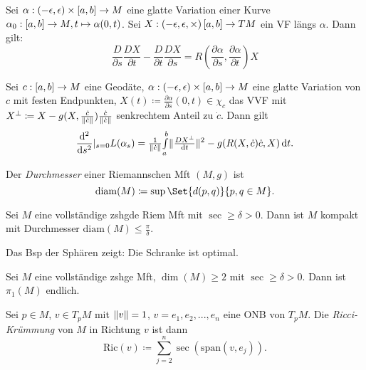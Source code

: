 \documentclass{cheat-sheet}
\newcommand{\vinterval}{\ointerval{-\epsilon}{\epsilon}} %
\newcommand{\Span}{\mathrm{span}} %
\newcommand{\diam}{\mathrm{diam}} %
\newcommand{\Ric}{\mathrm{Ric}} %
\newcommand{\abinterval}{\cinterval{a}{b}} %
\begin{document}

\begin{satz}
  Sei $\alpha : \vinterval \times \abinterval \to M$ eine glatte Variation einer Kurve $\alpha_0 : \abinterval \to M, t \mapsto \alpha(0, t)$.
  Sei $X : \ointerval{-\epsilon,\epsilon} \times \abinterval \to TM$ ein VF längs $\alpha$. Dann gilt:
  \[
    \frac{D}{\partial s} \frac{DX}{\partial t} - \frac{D}{\partial t} \frac{DX}{\partial s} = R\left(\frac{\partial \alpha}{\partial s}, \frac{\partial \alpha}{\partial t}\right) X
  \]
\end{satz}

\begin{satz}
  Sei $c: \abinterval \to M$ eine Geodäte, $\alpha : \vinterval \times \abinterval \to M$ eine glatte Variation von $c$ mit festen Endpunkten, $X(t) \coloneqq \tfrac{\partial \alpha}{\partial s}(0, t) \in \chi_c$ das VVF mit $X^\perp \coloneqq X - g(X, \tfrac{\dot{c}}{\lVert\dot{c}\rVert}) \tfrac{\dot{c}}{\lVert\dot{c}\rVert}$ senkrechtem Anteil zu $\dot{c}$. Dann gilt
  \[
    \frac{\mathrm{d}^2}{\mathrm{d} s^2} |_{s=0} L(\alpha_s) = \tfrac{1}{\lVert\dot{c}\rVert} {\textstyle \int\limits_{a}^{b}} \lVert\tfrac{D X^\perp}{\mathrm{d} t}\rVert^2 - g(R(X,\dot{c})\dot{c},X) \,\mathrm{d} t.
  \]
\end{satz}


\begin{defn}
  Der \emph{Durchmesser} einer Riemannschen Mft $(M, g)$ ist
  \[ \diam(M) \coloneqq \sup \Set{d(p,q)}{ p,q \in M }. \]
\end{defn}

\begin{satz}
  Sei $M$ eine vollständige zshgde Riem Mft mit $\sec \geq \delta > 0$. Dann ist $M$ kompakt mit Durchmesser $\diam(M) \leq \tfrac{\pi}{\delta}$.
\end{satz}

\begin{bem}
  Das Bsp der Sphären zeigt: Die Schranke ist optimal.
\end{bem}

\begin{kor}
  Sei $M$ eine vollständige zshge Mft, $\dim(M) \geq 2$ mit $\sec \geq \delta > 0$. Dann ist $\pi_1(M)$ endlich.
\end{kor}

\begin{defn}
  Sei $p \in M$, $v \in T_p M$ mit $\lVert v\rVert = 1$, $v = e_1, e_2, ..., e_n$ eine ONB von $T_p M$. Die \emph{Ricci-Krümmung} von $M$ in Richtung $v$ ist dann
  \[ \Ric(v) \coloneqq \sum_{j=2}^n \sec(\Span(v, e_j)). \]
\end{defn}
\end{document}
